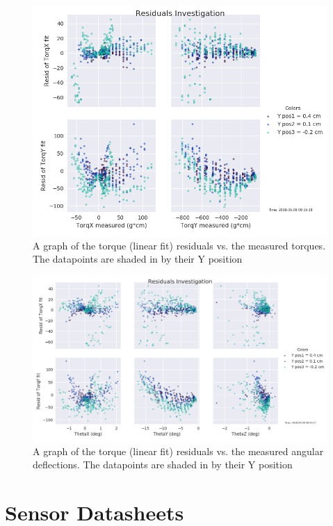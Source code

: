 \documentclass[preprint,12pt,3p]{elsarticle}
\begin{document}
\begin{figure}[H]
\centering
\includegraphics[width=1\textwidth]{images/round1/resids_Torq_coloredY}
\caption{A graph of the torque (linear fit) residuals vs. the measured torques.
The datapoints are shaded in by their Y position}
\end{figure}

\begin{figure}[H]
\centering
\includegraphics[width=1\textwidth]{images/round1/resids_Theta_coloredY.png}
\caption{A graph of the torque (linear fit) residuals vs. the measured angular
    deflections. The datapoints are shaded in by their Y position}
\end{figure}

\newpage

\section{Sensor Datasheets}
\label{appendix-sensors}
\end{document}
